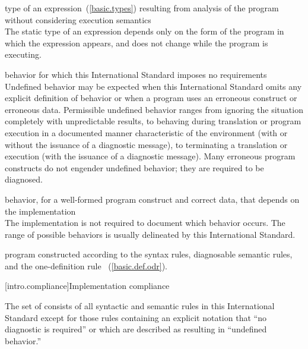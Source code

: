 %
type of an expression~(\ref{basic.types}) resulting from
analysis of the program without considering execution semantics\\
\enternote The
static type of an expression depends only on the form of the program in
which the expression appears, and does not change while the program is
executing. \exitnote

%
behavior for which this International Standard
imposes no requirements\\
\enternote Undefined behavior may be expected when
this International Standard omits any explicit
definition of behavior or when a program uses an erroneous construct or erroneous data.
Permissible undefined behavior ranges
from ignoring the situation completely with unpredictable results, to
behaving during translation or program execution in a documented manner
characteristic of the environment (with or without the issuance of a
diagnostic message), to terminating a translation or execution (with the
issuance of a diagnostic message). Many erroneous program constructs do
not engender undefined behavior; they are required to be diagnosed.
\exitnote

%
behavior, for a well-formed program construct and correct data, that
depends on the implementation\\
\enternote The implementation is not required to
document which behavior occurs. The range of
possible behaviors is usually delineated by this International Standard.
\exitnote

%
\Cpp  program constructed according to the syntax rules, diagnosable
semantic rules, and the one-definition rule ~(\ref{basic.def.odr}).%

[intro.compliance]{Implementation compliance}

\pnum
{}%
%
The set of
consists of all syntactic and semantic rules in this International
Standard except for those rules containing an explicit notation that
``no diagnostic is required'' or which are described as resulting in
``undefined behavior.''

